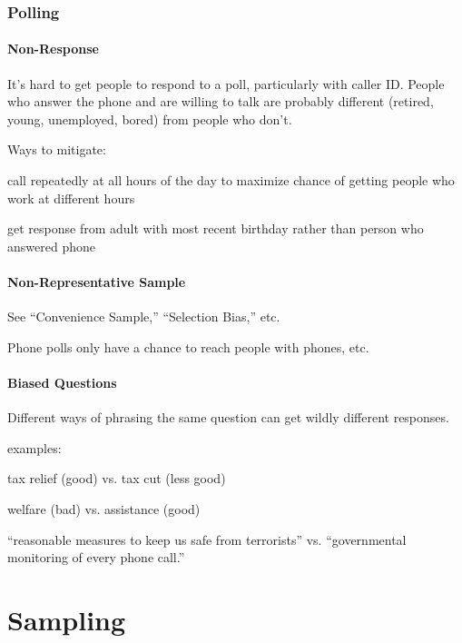 \documentclass[landscape]{exam}
\begin{document}
  \section{Polling}
  \subsection{Non-Response}
  It's hard to get people to respond to a poll, particularly with caller ID.
  People who answer the phone and are willing to talk are probably different
  (retired, young, unemployed, bored) from people who don't.

  Ways to mitigate:
  \begin{itemize*}
    \item call repeatedly at all hours of the day to maximize chance of getting
      people who work at different hours

    \item get response from adult with most recent birthday rather than person
      who answered phone
  \end{itemize*}

  \subsection{Non-Representative Sample}
  See ``Convenience Sample,'' ``Selection Bias,'' etc.

  Phone polls only have a chance to reach people with phones, etc.

  \subsection{Biased Questions}
  Different ways of phrasing the same question can get wildly different
  responses.

  examples:
  \begin{itemize*}
    \item tax relief (good) vs. tax cut (less good)
    \item welfare (bad) vs. assistance (good)
    \item ``reasonable measures to keep us safe from terrorists'' vs.
      ``governmental monitoring of every phone call.''
  \end{itemize*}

  \part{Sampling}
\end{document}
